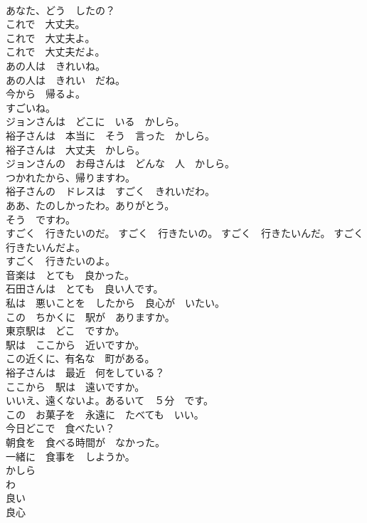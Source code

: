 \documentclass[8pt]{extreport}
\begin{document}
\begin{CJK}{UTF8}{min}
\\	あなた、どう　したの？	
\\	これで　大丈夫。	
\\	これで　大丈夫よ。	
\\	これで　大丈夫だよ。	
\\	あの人は　きれいね。	
\\	あの人は　きれい　だね。	
\\	今から　帰るよ。	
\\	すごいね。	
\\	ジョンさんは　どこに　いる　かしら。	
\\	裕子さんは　本当に　そう　言った　かしら。	
\\	裕子さんは　大丈夫　かしら。	
\\	ジョンさんの　お母さんは　どんな　人　かしら。	
\\	つかれたから、帰りますわ。	
\\	裕子さんの　ドレスは　すごく　きれいだわ。	
\\	ああ、たのしかったわ。ありがとう。	
\\	そう　ですわ。	
\\	すごく　行きたいのだ。 すごく　行きたいの。 すごく　行きたいんだ。 すごく　行きたいんだよ。	
\\	すごく　行きたいのよ。	
\\	音楽は　とても　良かった。	
\\	石田さんは　とても　良い人です。	
\\	私は　悪いことを　したから　良心が　いたい。	
\\	この　ちかくに　駅が　ありますか。	
\\	東京駅は　どこ　ですか。	
\\	駅は　ここから　近いですか。	
\\	この近くに、有名な　町がある。	
\\	裕子さんは　最近　何をしている？	
\\	ここから　駅は　遠いですか。	
\\	いいえ、遠くないよ。あるいて　５分　です。	
\\	この　お菓子を　永遠に　たべても　いい。	
\\	今日どこで　食べたい？	
\\	朝食を　食べる時間が　なかった。	
\\	一緒に　食事を　しようか。	
\\	かしら	
\\	わ	
\\	良い	
\\	良心	

\end{CJK}
\end{document}
